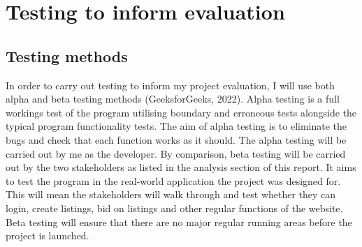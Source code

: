 \chapter{Testing to inform evaluation}
\section{Testing methods}
In order to carry out testing to inform my project evaluation, I will use both alpha and beta testing methods (GeeksforGeeks, 2022). Alpha testing is a full workings test of the program utilising boundary and erroneous tests alongside the typical program functionality tests. The aim of alpha testing is to eliminate the bugs and check that each function works as it should. The alpha testing will be carried out by me as the developer. By comparison, beta testing will be carried out by the two stakeholders as listed in the analysis section of this report. It aims to test the program in the real-world application the project was designed for. This will mean the stakeholders will walk through and test whether they can login, create listings, bid on listings and other regular functions of the website. Beta testing will ensure that there are no major regular running areas before the project is launched.

